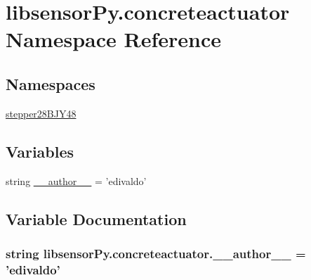 \hypertarget{namespacelibsensorPy_1_1concreteactuator}{}\section{libsensor\+Py.\+concreteactuator Namespace Reference}
\label{namespacelibsensorPy_1_1concreteactuator}
\subsection*{Namespaces}
\begin{DoxyCompactItemize}
\item 
 \hyperlink{namespacelibsensorPy_1_1concreteactuator_1_1stepper28BJY48}{stepper28\+B\+J\+Y48}
\end{DoxyCompactItemize}
\subsection*{Variables}
\begin{DoxyCompactItemize}
\item 
string \hyperlink{namespacelibsensorPy_1_1concreteactuator_a69815b6fd3990897e7bd4b0a6072e8d2}{\+\_\+\+\_\+author\+\_\+\+\_\+} = 'edivaldo'
\end{DoxyCompactItemize}


\subsection{Variable Documentation}
\hypertarget{namespacelibsensorPy_1_1concreteactuator_a69815b6fd3990897e7bd4b0a6072e8d2}{}
\subsubsection[{\+\_\+\+\_\+author\+\_\+\+\_\+}]{\setlength{\rightskip}{0pt plus 5cm}string libsensor\+Py.\+concreteactuator.\+\_\+\+\_\+author\+\_\+\+\_\+ = 'edivaldo'}\label{namespacelibsensorPy_1_1concreteactuator_a69815b6fd3990897e7bd4b0a6072e8d2}
